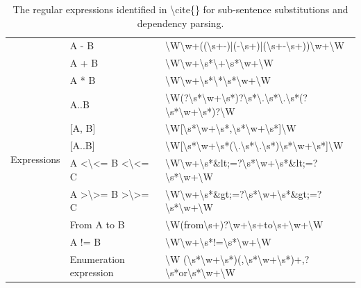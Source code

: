 \begin{table}[]
\begin{tabular}{|l|l|l|}
		\multirow{11}{*}{Expressions} & A - B & \textbackslash{}W\textbackslash{}w+((\textbackslash{}s+-)|(-\textbackslash{}s+)|(\textbackslash{}s+-\textbackslash{}s+))\textbackslash{}w+\textbackslash{}W \\ \cline{2-3} 
		& A + B & \textbackslash{}W\textbackslash{}w+\textbackslash{}s*\textbackslash{}+\textbackslash{}s*\textbackslash{}w+\textbackslash{}W \\ \cline{2-3} 
		& A * B & \textbackslash{}W\textbackslash{}w+\textbackslash{}s*\textbackslash{}*\textbackslash{}s*\textbackslash{}w+\textbackslash{}W \\ \cline{2-3} 
		& A..B & \textbackslash{}W(?\textbackslash{}s*\textbackslash{}w+\textbackslash{}s*)?\textbackslash{}s*\textbackslash{}.\textbackslash{}s*\textbackslash{}.\textbackslash{}s*(?\textbackslash{}s*\textbackslash{}w+\textbackslash{}s*)?\textbackslash{}W \\ \cline{2-3} 
		& {[}A, B{]} & \textbackslash{}W[\textbackslash{}s*\textbackslash{}w+\textbackslash{}s*,\textbackslash{}s*\textbackslash{}w+\textbackslash{}s*]\textbackslash{}W \\ \cline{2-3} 
		& {[}A..B{]} & \textbackslash{}W[\textbackslash{}s*\textbackslash{}w+\textbackslash{}s*(\textbackslash{}.\textbackslash{}s*\textbackslash{}.\textbackslash{}s*)\textbackslash{}s*\textbackslash{}w+\textbackslash{}s*]\textbackslash{}W \\ \cline{2-3} 
		& A \textless{}\textbackslash{}\textless{}= B \textless{}\textbackslash{}\textless{}= C & \textbackslash{}W\textbackslash{}w+\textbackslash{}s*\&lt;=?\textbackslash{}s*\textbackslash{}w+\textbackslash{}s*\&lt;=?\textbackslash{}s*\textbackslash{}w+\textbackslash{}W \\ \cline{2-3} 
		& A \textgreater{}\textbackslash{}\textgreater{}= B \textgreater{}\textbackslash{}\textgreater{}= C & \textbackslash{}W\textbackslash{}w+\textbackslash{}s*\&gt;=?\textbackslash{}s*\textbackslash{}w+\textbackslash{}s*\&gt;=?\textbackslash{}s*\textbackslash{}w+\textbackslash{}W \\ \cline{2-3} 
		& From A to B & \textbackslash{}W(from\textbackslash{}s+)?\textbackslash{}w+\textbackslash{}s+to\textbackslash{}s+\textbackslash{}w+\textbackslash{}W \\ \cline{2-3} 
		& A != B & \textbackslash{}W\textbackslash{}w+\textbackslash{}s*!=\textbackslash{}s*\textbackslash{}w+\textbackslash{}W \\ \cline{2-3} 
		& Enumeration expression & \textbackslash{}W (\textbackslash{}s*\textbackslash{}w+\textbackslash{}s*)(,\textbackslash{}s*\textbackslash{}w+\textbackslash{}s*)+,?\textbackslash{}s*or\textbackslash{}s*\textbackslash{}w+\textbackslash{}W \\ \hline
	\end{tabular}
	\caption{The regular expressions identified in \textbackslash{}cite\{\} for sub-sentence substitutions and dependency parsing.}
	\label{tab:zhou-regex}
\end{table}

